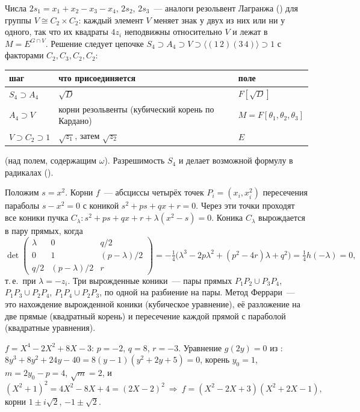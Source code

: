 \begin{remark}
Числа $2s_1=x_1+x_2-x_3-x_4$, $2s_2$, $2s_3$~--- аналоги резольвент Лагранжа () для группы $V\cong C_2\times C_2$: каждый элемент
$V$ меняет знак у двух из них или ни у одного, так что их квадраты $4z_i$ неподвижны относительно $V$ и лежат в $M=E^{G\cap V}$.
Решение следует цепочке $S_4\supset A_4\supset V\supset\langle(1\,2)(3\,4)\rangle\supset1$ с факторами $C_2,C_3,C_2,C_2$:
\begin{center}
\begin{tabular}{@{}lll@{}}
\toprule
шаг & что присоединяется & поле\\
\midrule
$S_4\supset A_4$ & $\sqrt D$ & $F[\sqrt D]$\\
$A_4\supset V$ & корни резольвенты (кубический корень по Кардано) & $M=F[\theta_1,\theta_2,\theta_3]$\\
$V\supset C_2\supset1$ & $\sqrt{z_1}$, затем $\sqrt{z_2}$ & $E$\\
\bottomrule
\end{tabular}
\end{center}
(над полем, содержащим $\omega$). Разрешимость $S_4$ и делает возможной формулу в радикалах ().
\end{remark}

\begin{aside}
Положим $s=x^2$. Корни $f$~--- абсциссы четырёх точек $P_i=(x_i,x_i^2)$ пересечения параболы $s-x^2=0$ с коникой
$s^2+ps+qx+r=0$. Через эти точки проходят все коники пучка $C_\lambda\colon s^2+ps+qx+r+\lambda(x^2-s)=0$. Коника $C_\lambda$ вырождается в
пару прямых, когда
\[
\det\begin{pmatrix}\lambda&0&q/2\\0&1&(p-\lambda)/2\\q/2&(p-\lambda)/2&r\end{pmatrix}=-\tfrac14\bigl(\lambda^3-2p\lambda^2+(p^2-4r)\lambda+q^2\bigr)=\tfrac14h(-\lambda)=0,
\]
т.\,е.\ при $\lambda=-z_i$. Три вырожденные коники~--- пары прямых $P_1P_2\cup P_3P_4$, $P_1P_3\cup P_2P_4$, $P_1P_4\cup P_2P_3$, по одной на
разбиение на пары. Метод Феррари~--- это нахождение вырожденной коники (кубическое уравнение), её разложение на две прямые
(квадратный корень) и пересечение каждой прямой с параболой (квадратные уравнения).
\end{aside}

\begin{example}[4.9m]
$f=X^4-2X^2+8X-3$: $p=-2$, $q=8$, $r=-3$. Уравнение $g(2y)=0$ из : $8y^3+8y^2+24y-40=8(y-1)(y^2+2y+5)=0$, корень $y_0=1$, $m=2y_0-p=4$,
$\sqrt m=2$, и
\[
(X^2+1)^2=4X^2-8X+4=(2X-2)^2\ \Longrightarrow\ f=(X^2-2X+3)(X^2+2X-1),
\]
корни $1\pm i\sqrt2$, $-1\pm\sqrt2$.
\end{example}

